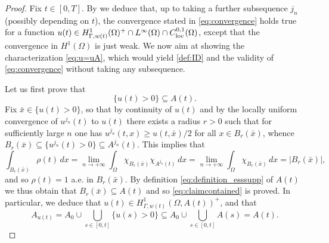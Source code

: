 \documentclass[a4paper,11pt,reqno]{amsart}
\numberwithin{equation}{section}
\theoremstyle{definition}
\theoremstyle{remark}
\begin{document}
\begin{proof}
Fix $t\in [0,T]$. By  we deduce that, up to taking a further subsequence $j_n$ (possibly depending on $t$), the convergence stated in \eqref{eq:convergence} holds true for a function $u(t)\in H^1_{\Gamma,w(t)}(\Omega)^+\cap L^\infty(\Omega)\cap C^{0,1}_{\rm loc}(\Omega)$, except that the convergence in $H^1(\Omega)$ is just weak. We now aim at showing the characterization \eqref{eq:u=uA}, which would yield \ref{def:ID} and the validity of \eqref{eq:convergence} without taking any subsequence.

Let us first prove that
\begin{equation}\label{eq:claimcontained}
    \{u(t)>0\}\subseteq A(t).
\end{equation}
Fix $\bar x\in\{u(t)>0\}$, so that by continuity of $u(t)$ and by the locally uniform convergence of $u^{j_n}(t)$ to $u(t)$ there exists a radius $r>0$ such that for sufficiently large $n$ one has $u^{j_n}(t,x)\ge u(t,\bar x)/2$ for all $x\in B_r(\bar x)$, whence $B_r(\bar x)\subseteq \{u^{j_n}(t)>0\}\subseteq A^{j_n}(t)$. This implies that
\begin{equation}
    \int_{B_r(\bar x)}\rho(t)\, dx=\lim\limits_{n\to +\infty}\int_\Omega \chi_{B_r(\bar x)} \chi_{A^{j_n}(t)}\, dx= \lim\limits_{n\to +\infty}\int_\Omega \chi_{B_r(\bar x)} \, dx=|B_r(\bar x)|,
\end{equation}
and so $\rho(t)=1$ a.e. in $B_r(\bar x)$. By definition \eqref{eq:definition_esssupp} of $A(t)$ we thus obtain that $B_r(\bar x)\subseteq A(t)$ and so \eqref{eq:claimcontained} is proved. In particular, we deduce that $u(t)\in H^1_{\Gamma,w(t)}(\Omega, A(t))^+$, and that
\begin{equation}\label{eq:AuinA}
    A_{u(t)}=A_0\cup\bigcup_{s\in [0,t]}\{u(s)>0\}\subseteq A_0\cup\bigcup_{s\in [0,t]}A(s)=A(t).
\end{equation}


\end{proof}
\end{document}
